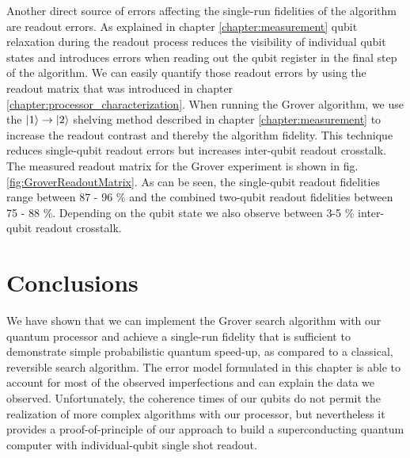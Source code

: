 Another direct source of errors affecting the single-run fidelities of the algorithm are readout errors. As explained in chapter \ref{chapter:measurement} qubit relaxation during the readout process reduces the visibility of individual qubit states and introduces errors when reading out the qubit register in the final step of the algorithm. We can easily quantify those readout errors by using the readout matrix that was introduced in chapter \ref{chapter:processor_characterization}. When running the Grover algorithm, we use the $\left| 1 \right>\to\left| 2 \right>$ shelving method described in chapter \ref{chapter:measurement} to increase the readout contrast and thereby the algorithm fidelity. This technique reduces single-qubit readout errors but increases inter-qubit readout crosstalk. The measured readout matrix for the Grover experiment is shown in fig. \ref{fig:GroverReadoutMatrix}. As can be seen, the single-qubit readout fidelities range between 87 - 96 \% and the combined two-qubit readout fidelities between 75 - 88 \%. Depending on the qubit state we also observe between 3-5 \% inter-qubit readout crosstalk.

\section{Conclusions}

We have shown that we can implement the Grover search algorithm with our quantum processor and achieve a single-run fidelity that is sufficient to demonstrate simple probabilistic quantum speed-up, as compared to a classical, reversible search algorithm. The error model formulated in this chapter is able to account for most of the observed imperfections and can explain the data we observed. Unfortunately, the coherence times of our qubits do not permit the realization of more complex algorithms with our processor, but nevertheless it provides a proof-of-principle of our approach to build a superconducting quantum computer with individual-qubit single shot readout.

